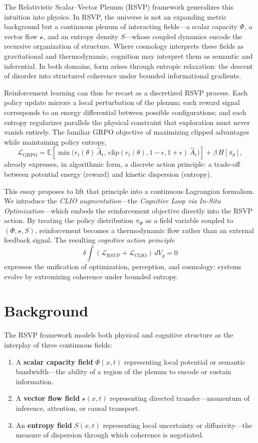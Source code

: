 \documentclass[11pt]{article}
\begin{document}
The Relativistic Scalar–Vector Plenum (RSVP) framework generalizes this intuition into physics. 
In RSVP, the universe is not an expanding metric background but a continuous plenum of interacting fields—a scalar capacity $\Phi$, a vector flow $\mathcal{v}$, and an entropy density $S$—whose coupled dynamics encode the recursive organization of structure. 
Where cosmology interprets these fields as gravitational and thermodynamic, cognition may interpret them as semantic and inferential. 
In both domains, form arises through entropic relaxation: the descent of disorder into structured coherence under bounded informational gradients.

Reinforcement learning can thus be recast as a discretized RSVP process. 
Each policy update mirrors a local perturbation of the plenum; each reward signal corresponds to an energy differential between possible configurations; and each entropy regularizer parallels the physical constraint that exploration must never vanish entirely. 
The familiar GRPO objective of maximizing clipped advantages while maintaining policy entropy,
\[
\mathcal{L}_{\mathrm{GRPO}}
=
\mathbb{E}\!\left[
  \min\!\big(
  r_t(\theta)\,\hat{A}_t,\,
  \mathrm{clip}(r_t(\theta),1{-}\epsilon,1{+}\epsilon)\,\hat{A}_t
  \big)
  \right]
  + \beta\,H[\pi_\theta],
\]
already expresses, in algorithmic form, a discrete action principle: a trade-off between potential energy (reward) and kinetic dispersion (entropy). 

This essay proposes to lift that principle into a continuous Lagrangian formalism. 
We introduce the \emph{CLIO augmentation}—the \textit{Cognitive Loop via In-Situ Optimization}—which embeds the reinforcement objective directly into the RSVP action. 
By treating the policy distribution $\pi_\Psi$ as a field variable coupled to $(\Phi, \mathcal{v}, S)$, reinforcement becomes a thermodynamic flow rather than an external feedback signal. 
The resulting \emph{cognitive action principle}
\[
\delta\!\int\!(\mathcal{L}_{\mathrm{RSVP}}+\mathcal{L}_{\mathrm{CLIO}})\,dV_g = 0
\]
expresses the unification of optimization, perception, and cosmology: systems evolve by extremizing coherence under bounded entropy.

\section{Background}
The RSVP framework models both physical and cognitive structure as the interplay of three continuous fields:

\begin{enumerate}
  \item A \textbf{scalar capacity field} $\Phi(x,t)$ representing local potential or semantic bandwidth—the ability of a region of the plenum to encode or sustain information.
  \item A \textbf{vector flow field} $\mathcal{v}(x,t)$ representing directed transfer—momentum of inference, attention, or causal transport.
  \item An \textbf{entropy field} $S(x,t)$ representing local uncertainty or diffusivity—the measure of dispersion through which coherence is negotiated.
\end{enumerate}
\end{document}
